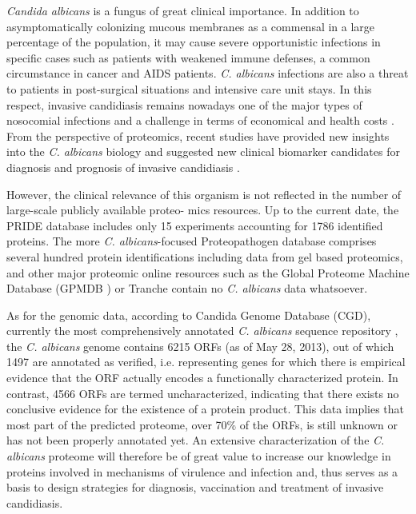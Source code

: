 \textit{Candida albicans} is a fungus of great clinical importance. In
addition to asymptomatically colonizing mucous membranes
as a commensal in a large percentage of the population, it
may cause severe opportunistic infections in specific cases
such as patients with weakened immune defenses, a common
circumstance in cancer and AIDS patients. \textit{C. albicans} infections
are also a threat to patients in post-surgical situations and
intensive care unit stays. In this respect, invasive candidiasis
remains nowadays one of the major types of nosocomial
infections and a challenge in terms of economical and health
costs \citep{Wisplinghoff2004, Moran2010, Tong2008}.
From the perspective of proteomics, recent studies
have provided new insights into the \textit{C. albicans} biology and
suggested new clinical biomarker candidates for diagnosis and
prognosis of invasive candidiasis \citep{Pitarch2006, Pitarch2006a,
Fernandez-Arenas2007, Pitarch2011}.

However, the clinical relevance of this organism is not
reflected in the number of large-scale publicly available proteo-
mics resources. Up to the current date, the PRIDE \citep{Vizcaino2013} database
includes only 15 experiments accounting for 1786 identified
proteins. The more \textit{C. albicans}-focused Proteopathogen database
\citep{Vialas2009b} comprises several hundred protein identifications including
data from gel based proteomics, and other major proteomic
online resources such as the Global Proteome Machine Database 
(GPMDB \citep{Craig2004}) or Tranche \citep{Smith2011} contain no \textit{C. albicans} data
whatsoever.

As for the genomic data, according to Candida Genome
Database (CGD), currently the most comprehensively annotated
\textit{C. albicans} sequence repository \citep{Costanzo2006a}, the \textit{C. albicans} genome
contains 6215 ORFs (as of May 28, 2013), out of which 1497 are
annotated as verified, i.e. representing genes for which there is
empirical evidence that the ORF actually encodes a functionally
characterized protein. In contrast, 4566 ORFs are termed
uncharacterized, indicating that there exists no conclusive evidence 
for the existence of a protein product. This data implies
that most part of the predicted proteome, over 70\% of the ORFs, is
still unknown or has not been properly annotated yet. An
extensive characterization of the \textit{C. albicans} proteome will
therefore be of great value to increase our knowledge in proteins
involved in mechanisms of virulence and infection and, thus
serves as a basis to design strategies for diagnosis, vaccination
and treatment of invasive candidiasis.

